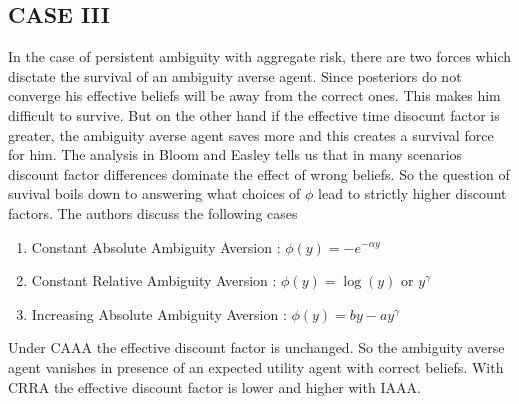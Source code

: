 \documentclass[12pt]{article}
\begin{document}
\subsection{CASE III}
In the case of persistent ambiguity with aggregate risk, there are two forces which disctate the survival of an ambiguity averse agent. Since posteriors do not converge his effective beliefs will be away from the correct ones. This makes him difficult to survive. But on the other hand if the effective time disocunt factor is greater, the ambiguity averse agent saves more and this creates a survival force for him. The analysis in Bloom and Easley tells us that in many scenarios discount factor differences dominate the effect of wrong beliefs. So the question of suvival boils down to answering what choices of $\phi$ lead to strictly higher discount factors. The authors discuss the following cases
\begin{enumerate}
	\item Constant Absolute Ambiguity Aversion : $\phi(y)=-e^{-\alpha y}$
	\item Constant Relative Ambiguity Aversion : $\phi(y)=\log(y)$ or $y^{\gamma}$
	\item Increasing Absolute Ambiguity Aversion : $\phi(y)=by-ay^{\gamma}$
	
\end{enumerate}
Under CAAA the effective discount factor is unchanged. So the ambiguity averse agent vanishes in presence of an expected utility agent with correct beliefs. With CRRA the effective discount factor is lower and higher with IAAA. 
\end{document}
